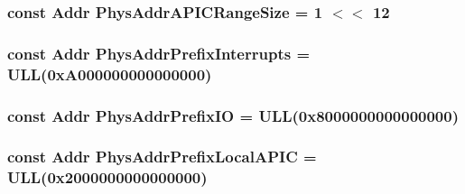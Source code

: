 \label{namespaceX86ISA_a8e4b3401b4f0c45853211157c986b0e1}
\hypertarget{namespaceX86ISA_a4069fe424ff0ea359df6d44547d14257}{
\subsubsection[{physAddr}]{}}
\label{namespaceX86ISA_a4069fe424ff0ea359df6d44547d14257}
\hypertarget{namespaceX86ISA_aca8409c60aba3dab705c6fa5fb51d987}{
\subsubsection[{PhysAddrAPICRangeSize}]{\setlength{\rightskip}{0pt plus 5cm}const {\bf Addr} {\bf PhysAddrAPICRangeSize} = 1 $<$$<$ 12}}
\label{namespaceX86ISA_aca8409c60aba3dab705c6fa5fb51d987}
\hypertarget{namespaceX86ISA_a414f8fb2b512b76d435158e58038b0f8}{
\subsubsection[{PhysAddrPrefixInterrupts}]{\setlength{\rightskip}{0pt plus 5cm}const {\bf Addr} {\bf PhysAddrPrefixInterrupts} = ULL(0xA000000000000000)}}
\label{namespaceX86ISA_a414f8fb2b512b76d435158e58038b0f8}
\hypertarget{namespaceX86ISA_a170b5c7d48662ed4dbde16baa5f663ca}{
\subsubsection[{PhysAddrPrefixIO}]{\setlength{\rightskip}{0pt plus 5cm}const {\bf Addr} {\bf PhysAddrPrefixIO} = ULL(0x8000000000000000)}}
\label{namespaceX86ISA_a170b5c7d48662ed4dbde16baa5f663ca}
\hypertarget{namespaceX86ISA_a6e6995725a6652599b0ea37948213257}{
\subsubsection[{PhysAddrPrefixLocalAPIC}]{\setlength{\rightskip}{0pt plus 5cm}const {\bf Addr} {\bf PhysAddrPrefixLocalAPIC} = ULL(0x2000000000000000)}}
